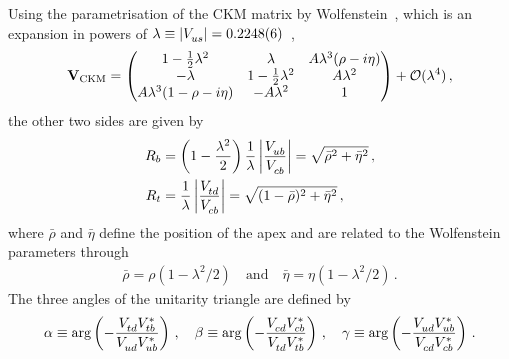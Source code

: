 Using the parametrisation of the CKM matrix by
Wolfenstein~\cite{Wolfenstein:1983yz}, which is an expansion in powers of
$\lambda \equiv |\Vus| = \num{0.2248\pm0.0006}$~\cite{PDG2016},
\begin{align}
\matr{V}_{\text{CKM}} =
\begin{pmatrix}
1 - \frac 12 \lambda^2 & \lambda & A\lambda^3(\rho - i\eta) \\
- \lambda & 1 - \frac 12 \lambda^2 & A\lambda^2 \\
A\lambda^3(1 - \rho - i\eta) & -A\lambda^2 & 1
\end{pmatrix}
+ \mathcal{O}(\lambda^4)\,,
\end{align}
the other two sides are given by
\begin{align}
	R_b &= \left(1 - \frac{\lambda^2}2\right)\frac 1\lambda \left|\frac \Vub\Vcb\right| = \sqrt{\bar{\rho}^2 + \bar{\eta}^2}\,,\label{eq:cpviolation:Rb}\\
	R_t &= \frac 1\lambda \left|\frac \Vtd\Vcb\right| = \sqrt{(1 - \bar{\rho})^2 + \bar{\eta}^2}\,,
\end{align}
where $\bar{\rho}$ and $\bar{\eta}$ define the position of the apex and are
related to the Wolfenstein parameters through
\begin{align}
	\bar{\rho} = \rho(1 - \lambda^2/2)\quad \text{and} \quad \bar{\eta} = \eta(1 - \lambda^2/2)\,.
\end{align}
The three angles of the unitarity triangle are defined by
\begin{align}
	\alpha \equiv \text{arg}\left(-\frac{\Vtd\Vtbs}{\Vud\Vubs}\right)\,,\quad
	\beta \equiv \text{arg}\left(-\frac{\Vcd\Vcbs}{\Vtd\Vtbs}\right)\,,\quad
	\gamma \equiv \text{arg}\left(-\frac{\Vud\Vubs}{\Vcd\Vcbs}\right)\,.
\label{eq:cpviolation:angles}
\end{align}

